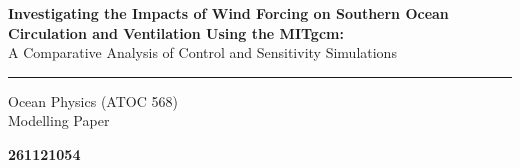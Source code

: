 \documentclass[12pt]{article}
\begin{document}
\begin{titlepage}
   \begin{center}
       \vspace*{3cm}

       {\fontsize{15}{15}\selectfont \textbf {Investigating the Impacts of Wind Forcing on Southern Ocean Circulation and Ventilation Using the MITgcm:}\\A Comparative Analysis of Control and Sensitivity Simulations\\ }
       \rule{\textwidth}{4pt}

       \vspace{1.2cm}
        {\fontsize{12}{14}\selectfont Ocean Physics (ATOC 568)\\Modelling Paper}\\
            
       \vspace{1.5cm}

       {\fontsize{14}{16}\selectfont \textbf{261121054}}
       
  
       \vspace{1.5cm}
     

\end{center}
\end{titlepage}
\end{document}
